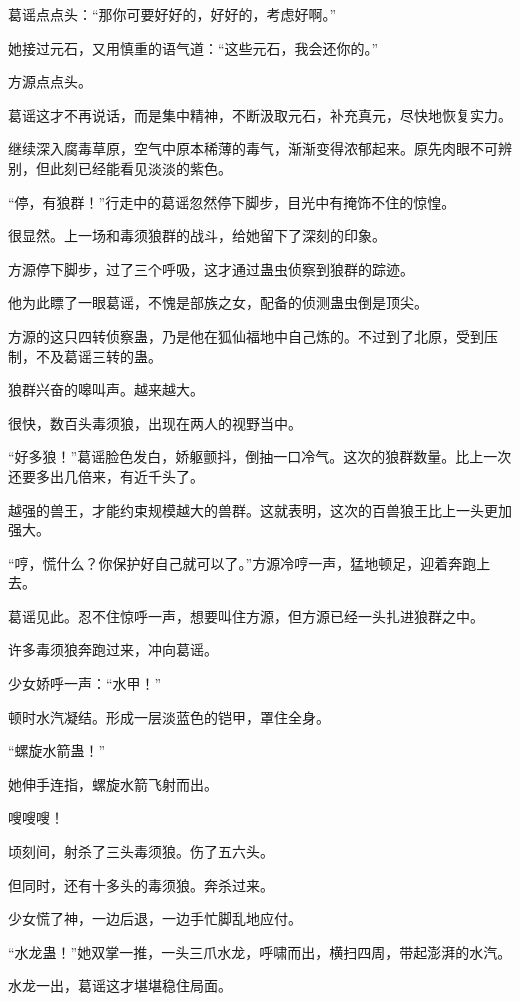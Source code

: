 \begin{this_body}
葛谣点点头：“那你可要好好的，好好的，考虑好啊。”

她接过元石，又用慎重的语气道：“这些元石，我会还你的。”

方源点点头。

葛谣这才不再说话，而是集中精神，不断汲取元石，补充真元，尽快地恢复实力。

继续深入腐毒草原，空气中原本稀薄的毒气，渐渐变得浓郁起来。原先肉眼不可辨别，但此刻已经能看见淡淡的紫色。

“停，有狼群！”行走中的葛谣忽然停下脚步，目光中有掩饰不住的惊惶。

很显然。上一场和毒须狼群的战斗，给她留下了深刻的印象。

方源停下脚步，过了三个呼吸，这才通过蛊虫侦察到狼群的踪迹。

他为此瞟了一眼葛谣，不愧是部族之女，配备的侦测蛊虫倒是顶尖。

方源的这只四转侦察蛊，乃是他在狐仙福地中自己炼的。不过到了北原，受到压制，不及葛谣三转的蛊。

狼群兴奋的嗥叫声。越来越大。

很快，数百头毒须狼，出现在两人的视野当中。

“好多狼！”葛谣脸色发白，娇躯颤抖，倒抽一口冷气。这次的狼群数量。比上一次还要多出几倍来，有近千头了。

越强的兽王，才能约束规模越大的兽群。这就表明，这次的百兽狼王比上一头更加强大。

“哼，慌什么？你保护好自己就可以了。”方源冷哼一声，猛地顿足，迎着奔跑上去。

葛谣见此。忍不住惊呼一声，想要叫住方源，但方源已经一头扎进狼群之中。

许多毒须狼奔跑过来，冲向葛谣。

少女娇呼一声：“水甲！”

顿时水汽凝结。形成一层淡蓝色的铠甲，罩住全身。

“螺旋水箭蛊！”

她伸手连指，螺旋水箭飞射而出。

嗖嗖嗖！

顷刻间，射杀了三头毒须狼。伤了五六头。

但同时，还有十多头的毒须狼。奔杀过来。

少女慌了神，一边后退，一边手忙脚乱地应付。

“水龙蛊！”她双掌一推，一头三爪水龙，呼啸而出，横扫四周，带起澎湃的水汽。

水龙一出，葛谣这才堪堪稳住局面。


\end{this_body}
